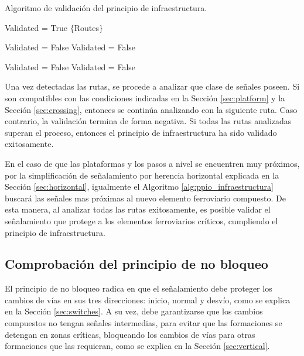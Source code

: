 		\begin{algorithm}[H]
			\caption{Algoritmo de validación del principio de infraestructura.}\label{alg:ppio_infraestructura}
			\DontPrintSemicolon
			\SetNoFillComment
			\LinesNotNumbered 
			Validated = True\;
			$\{$Routes$\}$\; 
			{
				{
					{
						Validated = False\;
					}
					{
						Validated = False\;
					}
				}
				
				{
					{
						Validated = False\;
					}
					{
						Validated = False\;
					}
				}
			}
			
		\end{algorithm}
		
		Una vez detectadas las rutas, se procede a analizar que clase de señales poseen.  Si son compatibles con las condiciones indicadas en la Sección \ref{sec:platform} y la Sección \ref{sec:crossing}, entonces se continúa analizando con la siguiente ruta. Caso contrario, la validación termina de forma negativa. Si todas las rutas analizadas superan el proceso, entonces el principio de infraestructura ha sido validado exitosamente.
		
		En el caso de que las plataformas y los pasos a nivel se encuentren muy próximos, por la simplificación de señalamiento por herencia horizontal explicada en la Sección \ref{sec:horizontal}, igualmente el Algoritmo \ref{alg:ppio_infraestructura} buscará las señales mas próximas al nuevo elemento ferroviario compuesto. De esta manera, al analizar todas las rutas exitosamente, es posible validar el señalamiento que protege a los elementos ferroviarios críticos, cumpliendo el principio de infraestructura.
		
	\subsection{Comprobación del principio de no bloqueo}
		
		El principio de no bloqueo radica en que el señalamiento debe proteger los cambios de vías en sus tres direcciones: inicio, normal y desvío, como se explica en la Sección \ref{sec:switches}. A su vez, debe garantizarse que los cambios compuestos no tengan señales intermedias, para evitar que las formaciones se detengan en zonas críticas, bloqueando los cambios de vías para otras formaciones que las requieran, como se explica en la Sección \ref{sec:vertical}.
		
